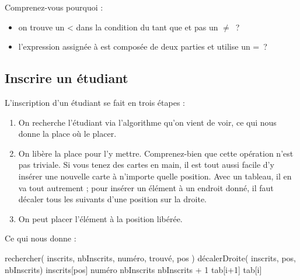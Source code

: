 			Comprenez-vous pourquoi :
			\begin{itemize}
			\item
				on trouve un < dans la condition du tant que et pas un $\neq$~?
			\item
				l'expression assignée à  est composée de deux parties
				et utilise un =~?
			\end{itemize}

		\subsection{Inscrire un étudiant}
				
			L'inscription d'un étudiant se fait en trois étapes :
			\begin{enumerate}
			\item
				On recherche l'étudiant via l'algorithme qu'on vient de voir,
				ce qui nous donne la place où le placer.
			\item
				On libère la place pour l'y mettre.
				Comprenez-bien que cette opération n'est pas triviale.
				Si vous tenez des cartes en main, 
				il est tout aussi facile d'y insérer une nouvelle carte
				à n'importe quelle position.
				Avec un tableau,
				il en va tout autrement ;
				pour insérer un élément à un endroit donné,
				il faut décaler tous les suivants d'une position sur la droite.
			\item
				On peut placer l'élément à la position libérée.
			\end{enumerate} 
			
			Ce qui nous donne :
			
			\begin{LDA}
					\Stmt rechercher( inscrits, nbInscrits, numéro, trouvé, pos )
					\Stmt décalerDroite( inscrits, pos, nbInscrits)
					\Let inscrits[pos] \Gets numéro
					\Let nbInscrits \Gets nbInscrits + 1
				\EndAlgo
				\Empty
						\Let tab[i+1] \Gets tab[i]
					\EndFor
				\EndAlgo
			\end{LDA}
		
